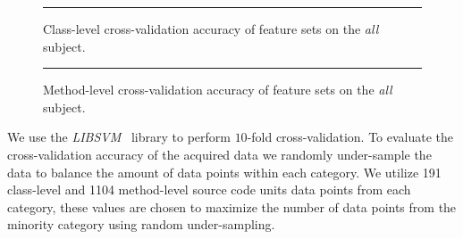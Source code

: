 \begin{figure}[!tb]
  \centering
  \begin{adjustbox}{max size={.95\textwidth}{.95\textheight}}
    
  \end{adjustbox}
  \caption{Class-level cross-validation accuracy of feature sets on the \emph{all} subject.}
  \vspace{2mm}
  \hrule
  \label{fig:all_cross_validation_features_class_graph}
\end{figure}

\begin{figure}[!tb]
  \centering
  \begin{adjustbox}{max size={.95\textwidth}{.95\textheight}}
    
  \end{adjustbox}
  \caption{Method-level cross-validation accuracy of feature sets on the \emph{all} subject.}
  \vspace{2mm}
  \hrule
  \label{fig:all_cross_validation_features_method_graph}
\end{figure}

We use the \emph{LIBSVM}~\cite{CL11} library to perform $10$-fold cross-validation. To evaluate the cross-validation accuracy of the acquired data we randomly under-sample the data to balance the amount of data points within each category. We utilize 191 class-level and 1104 method-level source code units data points from each category, these values are chosen to maximize the number of data points from the minority category using random under-sampling.

